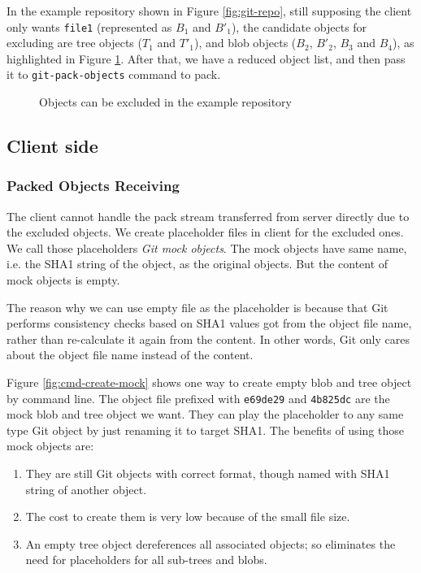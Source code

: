 \documentclass[preprint]{sigplanconf}
\begin{document}
In the example repository shown in Figure \ref{fig:git-repo}, still supposing
the client only wants \verb|file1| (represented as $B_1$ and $B'_1$), the
candidate objects for excluding are tree objects ($T_1$ and $T'_1$), and blob
objects ($B_2$, $B'_2$, $B_3$ and $B_4$), as highlighted in Figure
\ref{fig:find-obj-to-remove}.
After that, we have a reduced object list, and then pass it to
\verb|git-pack-objects| command to pack.
\begin{figure}[htpb]
  \centering
  
  \caption{Objects can be excluded in the example repository}
  \label{fig:find-obj-to-remove}
\end{figure}


\subsection{Client side}
\subsubsection{Packed Objects Receiving}
The client cannot handle the pack stream transferred from server directly
due to the excluded objects.
We create placeholder files in client for the excluded ones.
We call those placeholders \emph{Git mock objects}.
The mock objects have same name, i.e. the SHA1 string of the object, as the
original objects.
But the content of mock objects is empty.

The reason why we can use empty file as the placeholder is because that Git
performs consistency checks based on SHA1 values got from the object file name,
rather than re-calculate it again from the content.
In other words, Git only cares about the object file name instead of the
content.

Figure \ref{fig:cmd-create-mock} shows one way to create empty blob and tree
object by command line.
The object file prefixed with \verb|e69de29| and \verb|4b825dc| are the mock
blob and tree object we want.
They can play the placeholder to any same type Git object by just renaming it
to target SHA1.
The benefits of using those mock objects are:
\begin{enumerate}
  \item They are still Git objects with correct format, though named with SHA1
    string of another object.

  \item The cost to create them is very low because of the small file size.

  \item An empty tree object dereferences all associated objects;
    so eliminates the need for placeholders for all sub-trees and blobs.
\end{enumerate}
\end{document}

